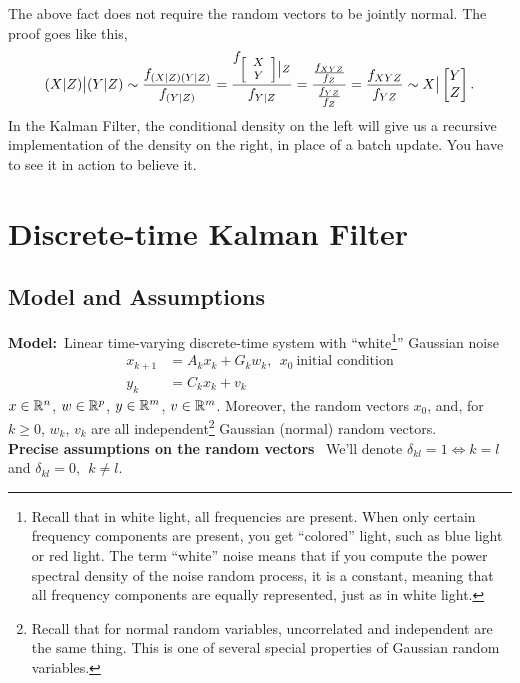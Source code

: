 The above fact does not require the random vectors to be jointly normal. The proof goes like this,
$$ (X|Z)\big| (Y|Z) \sim \frac{f_{(X|Z)(Y|Z)}}{f_{(Y|Z)}} = \frac{f_{\footnotesize{\left[\begin{array}{c}X\\ Y \end{array}\right] } \big| Z }}{f_{Y|Z}}=\frac{\frac{f_{XYZ}}{f_{Z}}}{\frac{f_{YZ}}{f_{Z}}}= \frac{f_{XYZ}}{f_{YZ}}\sim  X\big|\begin{bmatrix} Y \\ Z \end{bmatrix}.$$
In the Kalman Filter, the conditional density on the left will give us a recursive implementation of the density on the right, in place of a batch update. You have to see it in action to believe it.



 \section{Discrete-time Kalman Filter}  
    
 \subsection{Model and Assumptions}   
    
\textbf{Model:}~Linear time-varying discrete-time system with ``white\footnote{Recall that in white light, all frequencies are present. When only certain frequency components are present, you get ``colored'' light, such as blue light or red light. The term ``white'' noise means that if you compute the power spectral density of the noise random process, it is a constant, meaning that all frequency components are equally represented, just as in white light. }'' Gaussian noise
\begin{align*}
x_{k+1} &= A_k x_k + G_k w_k,~~x_0~\text{initial condition}\\
y_k &= C_k x_k + v_k
\end{align*}
$x\in \mathbb R^n$, $w \in \mathbb R^p$, $y\in \mathbb R^m$, $v\in \mathbb R^m$. Moreover, the random vectors
$x_0$, and, for $k\ge 0$,  $w_k$, $v_k$ are all independent\footnote{Recall that for normal random variables, uncorrelated and independent are the same thing. This is one of several special properties of Gaussian random variables. } Gaussian (normal) random vectors.\\


\textbf{Precise assumptions on the random vectors}~ We'll denote $\delta_{kl} = 1 \iff k = l$ and $\delta_{kl} = 0,~~k \neq l$.

